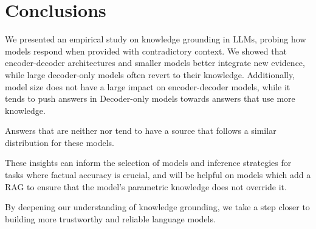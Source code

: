\section{Conclusions}

We presented an empirical study on knowledge grounding in LLMs, probing how models respond when provided with contradictory context.
We showed that encoder-decoder architectures and smaller models better integrate new evidence, while large decoder-only models often revert to their \Parametric{} knowledge.  Additionally, model size does not have a large impact on encoder-decoder models, while it tends to push answers in Decoder-only models towards answers that use more \Parametric{} knowledge.

Answers that are neither \Parametric{} nor \Contextual{} tend to have a source that follows a similar distribution for these models.

These insights can inform the selection of models and inference strategies for tasks where factual accuracy is crucial, and will be helpful on models which add a RAG to ensure that the model's parametric knowledge does not override it.

By deepening our understanding of knowledge grounding, we take a step closer to building more trustworthy and reliable language models.
